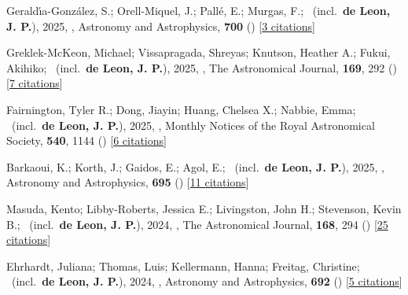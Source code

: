 \item[{\color{numcolor}\scriptsize80}] Gerald{\'\i}a-Gonz{\'a}lez, S.; Orell-Miquel, J.; Pall{\'e}, E.; Murgas, F.; \etal\ (incl.\ \textbf{de Leon, J. P.}), 2025, , Astronomy and Astrophysics, \textbf{700} () [\href{https://ui.adsabs.harvard.edu/abs/2025A&A...700A.216G}{3 citations}]

\item[{\color{numcolor}\scriptsize79}] Greklek-McKeon, Michael; Vissapragada, Shreyas; Knutson, Heather A.; Fukui, Akihiko; \etal\ (incl.\ \textbf{de Leon, J. P.}), 2025, , The Astronomical Journal, \textbf{169}, 292 () [\href{https://ui.adsabs.harvard.edu/abs/2025AJ....169..292G}{7 citations}]

\item[{\color{numcolor}\scriptsize78}] Fairnington, Tyler R.; Dong, Jiayin; Huang, Chelsea X.; Nabbie, Emma; \etal\ (incl.\ \textbf{de Leon, J. P.}), 2025, , Monthly Notices of the Royal Astronomical Society, \textbf{540}, 1144 () [\href{https://ui.adsabs.harvard.edu/abs/2025MNRAS.540.1144F}{6 citations}]

\item[{\color{numcolor}\scriptsize77}] Barkaoui, K.; Korth, J.; Gaidos, E.; Agol, E.; \etal\ (incl.\ \textbf{de Leon, J. P.}), 2025, , Astronomy and Astrophysics, \textbf{695} () [\href{https://ui.adsabs.harvard.edu/abs/2025A&A...695A.281B}{11 citations}]

\item[{\color{numcolor}\scriptsize76}] Masuda, Kento; Libby-Roberts, Jessica E.; Livingston, John H.; Stevenson, Kevin B.; \etal\ (incl.\ \textbf{de Leon, J. P.}), 2024, , The Astronomical Journal, \textbf{168}, 294 () [\href{https://ui.adsabs.harvard.edu/abs/2024AJ....168..294M}{25 citations}]

\item[{\color{numcolor}\scriptsize75}] Ehrhardt, Juliana; Thomas, Luis; Kellermann, Hanna; Freitag, Christine; \etal\ (incl.\ \textbf{de Leon, J. P.}), 2024, , Astronomy and Astrophysics, \textbf{692} () [\href{https://ui.adsabs.harvard.edu/abs/2024A&A...692A.220E}{5 citations}]

